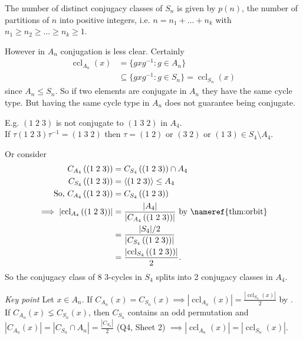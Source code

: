 \begin{corollary} \label{cor:6}
    The number of distinct conjugacy classes of $S_n$ is given by $p(n)$, the number of partitions of $n$ into positive integers, i.e. $n = n_1 + \dots + n_k$ with $n_1 \geq n_2 \geq \dots \geq n_k \geq 1$.
\end{corollary} 

However in $A_n$ conjugation is less clear. 
Certainly \begin{align*}
    \operatorname{ccl}_{A_n}(x) &= \{g x g^{-1} : g \in A_n\} \\
    &\subseteq \{g x g^{-1} : g \in S_n\} = \operatorname{ccl}_{S_n}(x)
\end{align*} since $A_n \leq S_n$.
So if two elements are conjugate in $A_n$ they have the same cycle type. 
But having the same cycle type in $A_n$ does not guarantee being conjugate.

E.g. $(1\; 2\; 3)$ is not conjugate to $(1\; 3\; 2)$ in $A_4$.\\
If $\tau (1\; 2\; 3) \tau^{-1} = (1\; 3\; 2)$ then $\tau = (1\; 2)$ or $(3\; 2)$ or $(1\; 3) \in S_4 \setminus A_4$.

Or consider 
\begin{align*}
    C_{A_4} \left( (1\; 2\; 3) \right) &= C_{S_4} \left( (1\; 2\; 3) \right) \cap A_4 \\
    C_{S_4} \left( (1\; 2\; 3) \right) &= \langle (1\; 2\; 3) \rangle \leq A_4 \\
    \text{So, } C_{A_4} \left( (1\; 2\; 3) \right) &= C_{S_4} \left( (1\; 2\; 3) \right) \\
    \implies \left| \operatorname{ccl}_{A_4} \left( (1\; 2\; 3) \right) \right| &= \frac{|A_4|}{\left| C_{A_4} \left( (1\; 2\; 3) \right) \right|} \text{ by \nameref{thm:orbit}} \\
    &= \frac{|S_4| / 2}{\left| C_{S_4} \left( (1\; 2\; 3) \right) \right|} \\
    &= \frac{\left| \operatorname{ccl}_{S_4} \left( (1\; 2\; 3) \right) \right|}{2}.
\end{align*} 
So the conjugacy class of 8 $3$-cycles in $S_4$ splits into 2 conjugacy classes in $A_4$.

\emph{Key point} Let $x \in A_n$.
If $C_{A_n}(x) = C_{S_n}(x) \implies |\operatorname{ccl}_{A_n}(x)| = \frac{| \operatorname{ccl}_{S_n}(x) |}{2}$ by . \\
If $C_{A_n}(x) \lneq C_{S_n}(x)$, then $C_{S_n}$ contains an odd permutation and $|C_{A_n}(x)| = |C_{S_n} \cap A_n| = \frac{|C_{S_n}|}{2}$ (Q4, Sheet 2) $\implies |\operatorname{ccl}_{A_n}(x)| = |\operatorname{ccl}_{S_n}(x)|$.

